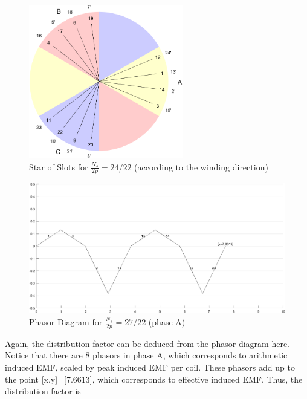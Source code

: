\documentclass[a4paper, 11pt]{article}
\begin{document}
\begin{figure}[h!]
	\begin{center}
		\includegraphics[width=0.6\textwidth]{Q2_2422_phasorDiagram_wSectors.png}
	\end{center}
	\caption{Star of Slots for $\frac{N_s}{2p}=24/22$ (according to the winding direction)}
	\label{fig:sos_2422_wSectors}
\end{figure}

\begin{figure}[h!]
	\begin{center}
		\includegraphics[width=1.0\textwidth]{Q2_2422_phasorDiagram_1ph.png}
	\end{center}
	\caption{Phasor Diagram for $\frac{N_s}{2p}=27/22$ (phase A)}
	\label{fig:phasor_d_2422}
\end{figure}

Again, the distribution factor can be deduced from the phasor diagram here. Notice that there are 8 phasors in phase A, which corresponds to arithmetic induced EMF, scaled by peak induced EMF per coil. These phasors add up to the point [x,y]=[7.6613], which corresponds to effective induced EMF. Thus, the distribution factor is
\end{document}
